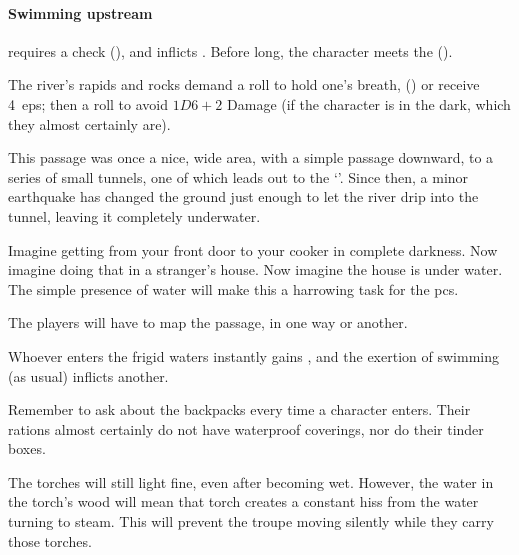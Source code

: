 \begin{multicols}{2}
\playCommentaryDrowning[t]

\paragraph{Swimming upstream}
requires a  check (\tn[14]), and inflicts .
Before long, the character meets the  ().



The river's rapids and rocks demand a  roll to hold one's breath, (\tn[10]) or receive 4~\glspl{ep}; then a  roll to avoid $1D6+2$ Damage (\tn[16] if the character is in the dark, which they almost certainly are).


\begin{exampletext}
  This passage was once a nice, wide area, with a simple passage downward, to a series of small tunnels, one of which leads out to the `'.
  Since then, a minor earthquake has changed the ground just enough to let the river drip into the tunnel, leaving it completely underwater.
\end{exampletext}

Imagine getting from your front door to your cooker in complete darkness.
Now imagine doing that in a stranger's house.
Now imagine the house is under water.
The simple presence of water will make this a harrowing task for the \glspl{pc}.

The players will have to map the passage, in one way or another.

Whoever enters the frigid waters instantly gains , and the exertion of swimming (as usual) inflicts another.

Remember to ask about the backpacks every time a character enters.
Their \glspl{ration} almost certainly do not have waterproof coverings, nor do their tinder boxes.

The torches will still light fine, even after becoming wet.
However, the water in the torch's wood will mean that torch creates a constant hiss from the water turning to steam.
This will prevent the troupe moving silently while they carry those torches.


\end{multicols}
